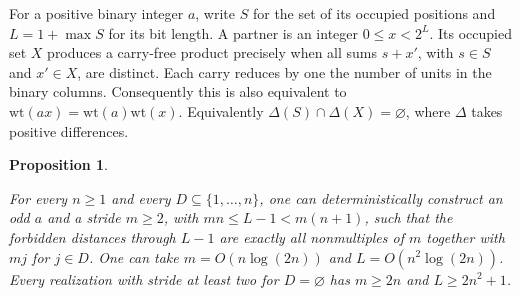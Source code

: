 \documentclass[11pt,letterpaper]{article}
\newtheorem{proposition}[theorem]{Proposition}
\numberwithin{equation}{section}
\begin{document}
For a positive binary integer \(a\), write \(S\) for the set of its occupied positions and
\(L=1+\max S\) for its bit length. A partner is an integer \(0\le x<2^L\). Its occupied set
\(X\) produces a carry-free product precisely when all sums \(s+x'\), with \(s\in S\) and
\(x'\in X\), are distinct. Each carry reduces by one the number of units in the binary
columns. Consequently this is also equivalent to
\(\mathrm{wt}(ax)=\mathrm{wt}(a)\mathrm{wt}(x)\). Equivalently
\(\Delta(S)\cap\Delta(X)=\varnothing\), where \(\Delta\) takes positive differences.

\begin{proposition}\label{prop:dist}

For every \(n\ge1\) and every \(D\subseteq\{1,\ldots,n\}\), one can deterministically
construct an odd \(a\) and a stride \(m\ge2\), with \(mn\le L-1<m(n+1)\), such that the
forbidden distances through \(L-1\) are exactly all nonmultiples of \(m\) together with \(mj\)
for \(j\in D\). One can take \(m=O(n\log(2n))\) and \(L=O(n^2\log(2n))\). Every realization
with stride at least two for \(D=\varnothing\) has \(m\ge2n\) and \(L\ge2n^2+1\).
\end{proposition}
\end{document}
